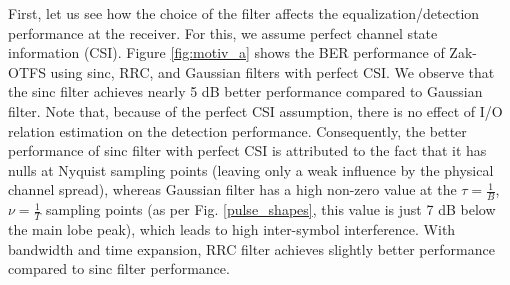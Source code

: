 First, let us see how the choice of the filter affects the equalization/detection performance at the receiver. For this, we assume perfect channel state information (CSI). Figure \ref{fig:motiv_a} shows the BER performance of Zak-OTFS using sinc, RRC, and Gaussian filters with perfect CSI. We observe that the sinc filter achieves nearly 5 dB better performance compared to Gaussian filter. Note that, because of the perfect CSI assumption, there is no effect of I/O relation estimation on the detection performance. Consequently, the better performance of sinc filter with perfect CSI is attributed to the fact that it has nulls at Nyquist sampling points (leaving only a weak influence by the physical channel spread), whereas Gaussian filter has a high non-zero value at the $\tau=\frac{1}{B}$, $\nu=\frac{1}{T}$ sampling points (as per Fig. \ref{pulse_shapes}, this value is just 7 dB below the main lobe peak), which leads to high inter-symbol interference. With bandwidth and time expansion, RRC filter achieves slightly better performance compared to sinc filter performance.


